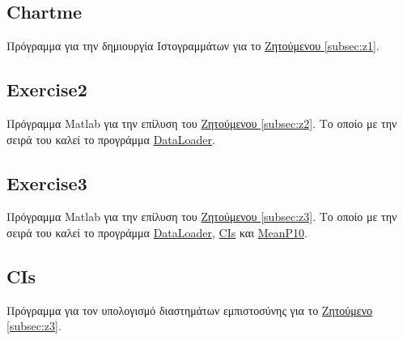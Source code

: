\documentclass[11pt]{scrartcl} %
\begin{document}
\subsection{Chartme}
\label{prog:Chartme}
Πρόγραμμα για την δημιουργία Ιστογραμμάτων για το \hyperref[subsection:z1]{Ζητούμενου \ref*{subsec:z1}}.



\subsection{Exercise2}
\label{prog:2}
Πρόγραμμα Matlab για την επίλυση του \hyperref[subsection:z2]{Ζητούμενου \ref*{subsec:z2}}. Το οποίο με την σειρά του καλεί το προγράμμα \hyperref[prog:DataLoader]{DataLoader}.



\subsection{Exercise3}
\label{prog:3}
Πρόγραμμα Matlab για την επίλυση του \hyperref[subsection:z3]{Ζητούμενου \ref*{subsec:z3}}. Το οποίο με την σειρά του καλεί το προγράμμα \hyperref[prog:DataLoader]{DataLoader}, \hyperref[prog:CIs]{CIs} και \hyperref[prog:MeanP10]{MeanP10}.


\subsection{CIs}
\label{prog:CIs}
Πρόγραμμα για τον υπολογισμό διαστημάτων εμπιστοσύνης για το \hyperref[subsection:z3]{Ζητούμενο \ref*{subsec:z3}}.

\end{document}
